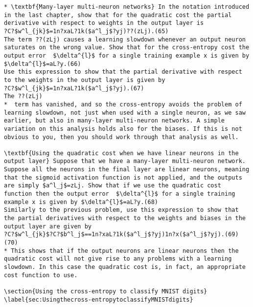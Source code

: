 \begin{lstlisting}
* \textbf{Many-layer multi-neuron networks} In the notation introduced in the last chapter, show that for the quadratic cost the partial derivative with respect to weights in the output layer is 
?C?$w^l_{jk}$=1n?xaL?1k($a^l_j$?yj)??(zLj).(65)
The term ??(zLj) causes a learning slowdown whenever an output neuron saturates on the wrong value. Show that for the cross-entropy cost the output error  $\delta^{l}$ for a single training example x is given by $\delta^{l}$=aL?y.(66)
Use this expression to show that the partial derivative with respect to the weights in the output layer is given by 
?C?$w^l_{jk}$=1n?xaL?1k($a^l_j$?yj).(67)
The ??(zLj)
*  term has vanished, and so the cross-entropy avoids the problem of learning slowdown, not just when used with a single neuron, as we saw earlier, but also in many-layer multi-neuron networks. A simple variation on this analysis holds also for the biases. If this is not obvious to you, then you should work through that analysis as well.

\textbf{Using the quadratic cost when we have linear neurons in the output layer} Suppose that we have a many-layer multi-neuron network. Suppose all the neurons in the final layer are linear neurons, meaning that the sigmoid activation function is not applied, and the outputs are simply $a^l_j$=zLj. Show that if we use the quadratic cost function then the output error  $\delta^{l}$ for a single training example x is given by $\delta^{l}$=aL?y.(68)
Similarly to the previous problem, use this expression to show that the partial derivatives with respect to the weights and biases in the output layer are given by 
?C?$w^l_{jk}$?C?$b^l_j$==1n?xaL?1k($a^l_j$?yj)1n?x($a^l_j$?yj).(69)(70)
* This shows that if the output neurons are linear neurons then the quadratic cost will not give rise to any problems with a learning slowdown. In this case the quadratic cost is, in fact, an appropriate cost function to use. 

\section{Using the cross-entropy to classify MNIST digits}
\label{sec:Usingthecross-entropytoclassifyMNISTdigits}


\end{lstlisting}
